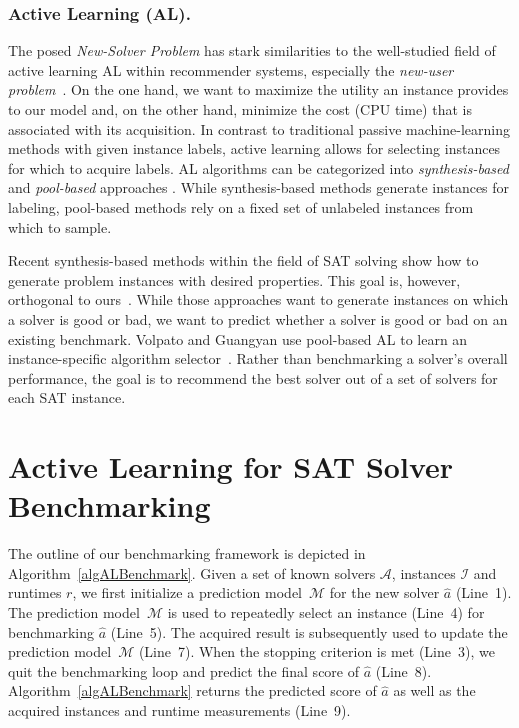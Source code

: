 \documentclass[runningheads]{llncs}
\begin{document}
\subsubsection{Active Learning (AL).}

The posed \emph{New-Solver Problem} has stark similarities to the well-studied field of active learning AL within recommender systems, especially the \emph{new-user problem}~\cite{RubensESK15}.
On the one hand, we want to maximize the utility an instance provides to our model and, on the other hand, minimize the cost (CPU time) that is associated with its acquisition.
In contrast to traditional passive machine-learning methods with given instance labels, active learning allows for selecting instances for which to acquire labels.
AL algorithms can be categorized into \emph{synthesis-bas\-ed} \cite{0001AEMN22,GarzonMG22,2019gaal} and \emph{pool-bas\-ed} approaches \cite{GolbandiKL11,HarpaleY08,KorenBV09}.
While synthesis-based methods generate instances for labeling, pool-based methods rely on a fixed set of unlabeled instances from which to sample.

Recent synthesis-based methods within the field of SAT solving show how to generate problem instances with desired properties.
This goal is, however, orthogonal to ours~\cite{0001AEMN22,GarzonMG22}.
While those approaches want to generate instances on which a solver is good or bad, we want to predict whether a solver is good or bad on an existing benchmark.
Volpato and Guangyan use pool-based AL to learn an instance-specific algorithm selector~\cite{volpato2019active}.
Rather than benchmarking a solver's overall performance, the goal is to recommend the best solver out of a set of solvers for each SAT instance.

\section{Active Learning for SAT Solver Benchmarking}
\label{sec:main}

The outline of our benchmarking framework is depicted in Algorithm~\ref{algALBenchmark}. 
Given a set of known solvers $\mathcal{A}$, instances $\mathcal{I}$ and runtimes $r$, we first initialize a prediction model~$\mathcal{M}$ for the new solver $\hat a$ (Line~1).
The prediction model~$\mathcal{M}$ is used to repeatedly select an instance (Line~4) for benchmarking $\hat a$ (Line~5). 
The acquired result is subsequently used to update the prediction model~$\mathcal{M}$ (Line~7). 
When the stopping criterion is met (Line~3), we quit the benchmarking loop and predict the final score of $\hat a$ (Line~8). 
Algorithm~\ref{algALBenchmark} returns the predicted score of $\hat a$ as well as the acquired instances and runtime measurements (Line~9). 
\end{document}

